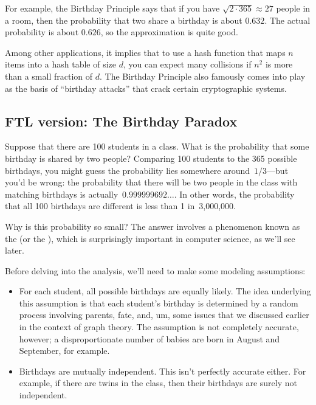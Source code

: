 For example, the Birthday Principle says that if you have $\sqrt{2
  \cdot 365} \approx 27$ people in a room, then the probability that
two share a birthday is about $0.632$.  The actual probability is
about $0.626$, so the approximation is quite good.

Among other applications, it implies that to use a hash function that
maps $n$ items into a hash table of size $d$, you can expect many
collisions if $n^2$ is more than a small fraction of $d$.  The
Birthday Principle also famously comes into play as the basis of
``birthday attacks'' that crack certain cryptographic systems.


\begin{editingnotes}

\section{FTL version: The Birthday Paradox}\label{ftl:birthday_principle_sec}

Suppose that there are 100 students in a class.  What is the
probability that some birthday is shared by two people?  Comparing 100
students to the 365 possible birthdays, you might guess the
probability lies somewhere around~$1/3$---but you'd be wrong: the
probability that there will be two people in the class with matching
birthdays is actually~$0.999999692\dots$.  In other words, the
probability that all 100 birthdays are different is less than 1
in~3,000,000.

Why is this probability so small?  The answer involves a phenomenon
known as the  (or the ), which is surprisingly important in computer science, as
we'll see later.

Before delving into the analysis, we'll need to make some modeling
assumptions:
\begin{itemize}

\item
For each student, all possible birthdays are equally likely.  The idea
underlying this assumption is that each student's birthday is
determined by a random process involving parents, fate, and, um, some
issues that we discussed earlier in the context of graph theory.
The assumption is not completely accurate, however; a disproportionate
number of babies are born in August and September, for example.

\item
Birthdays are mutually independent.  This isn't perfectly accurate
either.  For example, if there are twins in the class, then their
birthdays are surely not independent.


\end{itemize}
\end{editingnotes}
